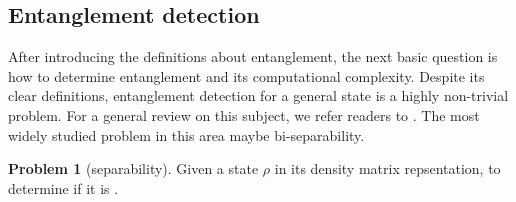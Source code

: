 \documentclass[
aps,
pra,
twocolumn,
floatfix,
]{revtex4-2}
\theoremstyle{plain}
\theoremstyle{definition}
\newtheorem{problem}{Problem}
\newtheorem{remark}{Remark}
\newcommand{\dm}{\rho}
\begin{document}





\subsection{Entanglement detection}
After introducing the definitions about entanglement, 
the next basic question is how to determine entanglement and its computational complexity.
Despite its clear definitions, entanglement detection for a general state is a highly non-trivial problem.
For a general review on this subject, we refer readers to \cite{guhneEntanglementDetection2009}.
The most widely studied problem in this area maybe bi-separability.
\begin{problem}[separability]\label{prm:separability}
	Given a state $\dm$ in its density matrix repsentation, to determine if it is .
\end{problem}
\end{document}
